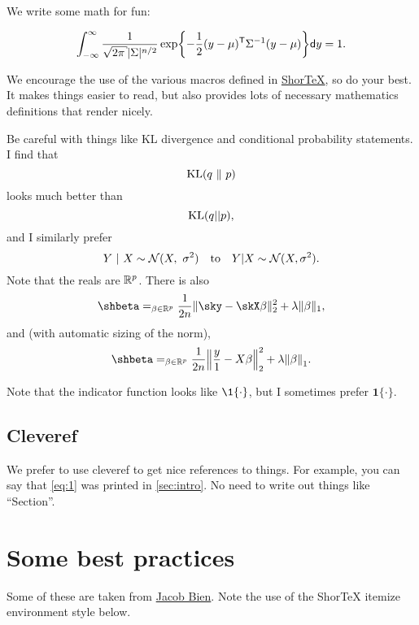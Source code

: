 \documentclass[12pt]{article}
\let\argmin\relax\DeclareMathOperator*{\argmin}{argmin}
\renewcommand{\d}{\mathsf{d}}
\begin{document}
We write some math for fun:

\[
\label{eq:1}
\int_{-\infty}^{\infty} \frac{1}{\sqrt{2\pi}|\Sigma|^{n/2}}
\exp\cbra*{-\frac{1}{2}(y - \mu)\T \Sigma^{-1} (y-\mu)} \d y = 1.
\]

We encourage the use of the various macros defined in
\href{https://github.com/trevorcampbell/shortex/}{ShorTeX},
so do your best. It makes things easier to read, but also provides lots of
necessary mathematics definitions that render nicely. 

Be careful with things like KL divergence and conditional probability
statements. I find that 
\[\KL(q\ \Vert\ p)\]
looks much better than 
\[\operatorname{KL}(q||p),\] 
and I similarly prefer 
\[
Y\ |\ X \sim \mathcal{N}(X,\ \sigma^2) 
\quad\textrm{to}\quad Y | X \sim \mathcal{N}(X,\sigma^2).
\] 
Note that the reals are $\mathbb{R}^p$. There is also
\[
\shbeta = \argmin_{\beta \in \reals^p} \frac{1}{2n}\norm{\sky - \skX\beta}_2^2 + 
\lambda \norm{\beta}_1,
\]
and (with automatic sizing of the norm),
\[
\shbeta = \argmin_{\beta \in \reals^p} \frac{1}{2n}\norm*{\frac{y}{1} - X\beta}_2^2 + 
\lambda \norm*{\beta}_1.
\]

Note that the indicator function looks like $\1\{\cdot\}$, but I sometimes
prefer $\mathbf{1}\{\cdot\}$.




\subsection{Cleveref}\label{sec:clever}

We prefer to use cleveref to get nice references to things. For example, you can
say that \cref{eq:1} was printed in \cref{sec:intro}. No need to write out
things like ``Section''.

\section{Some best practices}

Some of these are taken from
\href{http://faculty.marshall.usc.edu/Jacob-Bien/papers/manuscript-checklist.pdf}{Jacob
Bien}. Note the use of the ShorTeX itemize environment style below.
\end{document}
